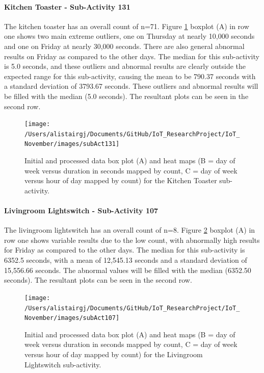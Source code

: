 \documentclass[11pt,]{article}
\let\oldparagraph\paragraph
\renewcommand{\paragraph}[1]{\oldparagraph{#1}\mbox{}}
\begin{document}
\hypertarget{kitchen-toaster---sub-activity-131}{%
\paragraph{Kitchen Toaster - Sub-Activity
131}\label{kitchen-toaster---sub-activity-131}}

The kitchen toaster has an overall count of n=71. Figure
\ref{fig:subAct131} boxplot (A) in row one shows two main extreme
outliers, one on Thursday at nearly 10,000 seconds and one on Friday at
nearly 30,000 seconds. There are also general abnormal results on Friday
as compared to the other days. The median for this sub-activity is 5.0
seconds, and these outliers and abnormal results are clearly outside the
expected range for this sub-activity, causing the mean to be 790.37
seconds with a standard deviation of 3793.67 seconds. These outliers and
abnormal results will be filled with the median (5.0 seconds). The
resultant plots can be seen in the second row.

\begin{figure}[H]

{\centering \texttt{[image: /Users/alistairgj/Documents/GitHub/IoT\_ResearchProject/IoT\_November/images/subAct131]} 

}

\caption{Initial and processed data box plot (A) and heat maps (B = day of week versus duration in seconds mapped by count, C = day of week versus hour of day mapped by count) for the Kitchen Toaster sub-activity.}\label{fig:subAct131}
\end{figure}

\hypertarget{livingroom-lightswitch---sub-activity-107}{%
\paragraph{Livingroom Lightswitch - Sub-Activity
107}\label{livingroom-lightswitch---sub-activity-107}}

The livingroom lightswitch has an overall count of n=8. Figure
\ref{fig:subAct107} boxplot (A) in row one shows variable results due to
the low count, with abnormally high results for Friday as compared to
the other days. The median for this sub-activity is 6352.5 seconds, with
a mean of 12,545.13 seconds and a standard deviation of 15,556.66
seconds. The abnormal values will be filled with the median (6352.50
seconds). The resultant plots can be seen in the second row.

\begin{figure}[H]

{\centering \texttt{[image: /Users/alistairgj/Documents/GitHub/IoT\_ResearchProject/IoT\_November/images/subAct107]} 

}

\caption{Initial and processed data box plot (A) and heat maps (B = day of week versus duration in seconds mapped by count, C = day of week versus hour of day mapped by count) for the Livingroom Lightswitch sub-activity.}\label{fig:subAct107}
\end{figure}
\end{document}
